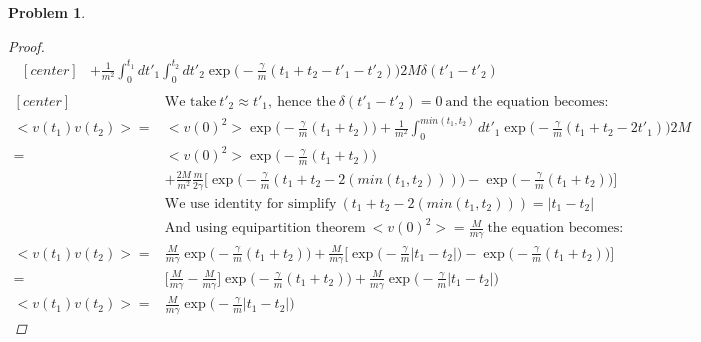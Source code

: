\documentclass[a4paper,12pt]{article}
\newtheorem{prob}{Problem}
\begin{document}
\begin{prob}
\begin{proof}
\begin{equation*}
\begin{aligned}[center]
		&+ \frac{1}{m^2} \int_{0}^{t_1} dt'_1\int_{0}^{t_2} dt'_2 \exp\big(-\frac{\gamma}{m}(t_1+t_2-t'_1-t'_2)\big)2M\delta(t'_1 - t'_2)\\
		\end{aligned}
		\end{equation*}
		\begin{equation*}
		\begin{aligned}[center]
		&\text{We take}\ t'_2 \approx t'_1,\ \text{hence the}\ \delta(t'_1 - t'_2) = 0\ \text{and the equation becomes:}\\
		<v(t_1) v(t_2)>=& \big<v(0)^2\big> \exp\big(-\frac{\gamma}{m}(t_1+t_2)\big)
		+ \frac{1}{m^2} \int_{0}^{min(t_1,t_2)} dt'_1 \exp\big(-\frac{\gamma}{m}(t_1+t_2-2t'_1)\big)2M\\
		=& \big<v(0)^2\big> \exp\big(-\frac{\gamma}{m}(t_1+t_2)\big)\\
		&+ \frac{2M}{m^2}\frac{m}{2\gamma} \bigg[\exp\big(-\frac{\gamma}{m}(t_1+t_2-2(min(t_1,t_2)))\big) - \exp\big(-\frac{\gamma}{m}(t_1+t_2)\big)\bigg]\\
		&\text{We use identity for simplify}\ (t_1+t_2-2(min(t_1,t_2))) = |t_1-t_2|\\
		&\text{And using equipartition theorem}\ \big<v(0)^2\big> = \frac{M}{m\gamma}\ \text{the equation becomes:}\\
		<v(t_1) v(t_2)>=& \frac{M}{m\gamma} \exp\big(-\frac{\gamma}{m}(t_1+t_2)\big)
		+ \frac{M}{m\gamma} \bigg[\exp\big(-\frac{\gamma}{m}|t_1-t_2|\big) - \exp\big(-\frac{\gamma}{m}(t_1+t_2)\big)\bigg]\\
		=& \bigg[\frac{M}{m\gamma} - \frac{M}{m\gamma}\bigg] \exp\big(-\frac{\gamma}{m}(t_1+t_2)\big)
		+ \frac{M}{m\gamma} \exp\big(-\frac{\gamma}{m}|t_1-t_2|\big)\\
		<v(t_1) v(t_2)> = & \frac{M}{m\gamma} \exp\big(-\frac{\gamma}{m}|t_1-t_2|\big)
		\end{aligned}
		\end{equation*}
	\end{proof}
\end{prob}
\end{document}
